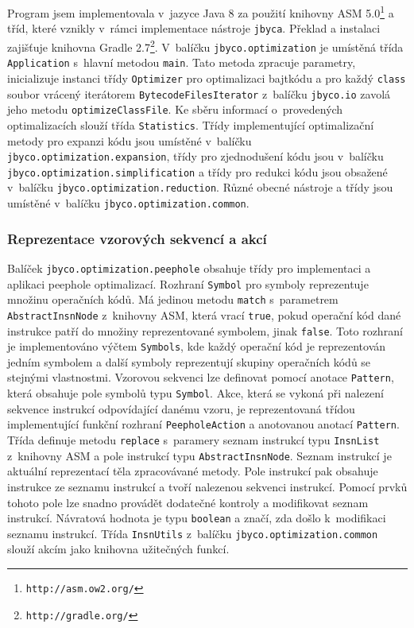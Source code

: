 Program jsem implementovala v~jazyce Java 8 za použití knihovny ASM 5.0\footnote{\texttt{http://asm.ow2.org/}} a tříd, které vznikly v~rámci implementace nástroje \texttt{jbyca}. Překlad a instalaci zajišťuje knihovna Gradle 2.7\footnote{\texttt{http://gradle.org/}}. V~balíčku \texttt{jbyco.optimization} je umístěná třída \texttt{Application} s~hlavní metodou \texttt{main}. Tato metoda zpracuje parametry, inicializuje instanci třídy \texttt{Optimizer} pro optimalizaci bajtkódu a pro každý \texttt{class} soubor vrácený iterátorem \texttt{BytecodeFilesIterator} z~balíčku \texttt{jbyco.io} zavolá jeho metodu \texttt{optimizeClassFile}. Ke sběru informací o~provedených optimalizacích slouží třída \texttt{Statistics}. Třídy implementující optimalizační metody pro expanzi kódu jsou umístěné v~balíčku \texttt{jbyco.optimization.expansion}, třídy pro zjednodušení kódu jsou v~balíčku \texttt{jbyco.optimization.simplification} a třídy pro redukci kódu jsou obsažené v~balíčku \texttt{jbyco.optimization.reduction}. Různé obecné nástroje a třídy jsou umístěné v~balíčku \texttt{jbyco.optimization.common}.

\subsubsection{Reprezentace vzorových sekvencí a akcí}

Balíček \texttt{jbyco.optimization.peephole} obsahuje třídy pro implementaci a aplikaci peephole optimalizací. Rozhraní \texttt{Symbol} pro symboly reprezentuje množinu operačních kódů. Má jedinou metodu \texttt{match} s~parametrem \texttt{AbstractInsnNode} z~knihovny ASM, která vrací \texttt{true}, pokud operační kód dané instrukce patří do množiny reprezentované symbolem, jinak \texttt{false}. Toto rozhraní je implementováno výčtem \texttt{Symbols}, kde každý operační kód je reprezentován jedním symbolem a další symboly reprezentují skupiny operačních kódů se stejnými vlastnostmi. Vzorovou sekvenci lze definovat pomocí anotace \texttt{Pattern}, která obsahuje pole symbolů typu \texttt{Symbol}. Akce, která se vykoná při nalezení sekvence instrukcí odpovídající danému vzoru, je reprezentovaná třídou implementující funkční rozhraní \texttt{PeepholeAction} a anotovanou anotací \texttt{Pattern}. Třída definuje metodu \texttt{replace} s~paramery seznam instrukcí typu \texttt{InsnList} z~knihovny ASM a pole instrukcí typu \texttt{AbstractInsnNode}. Seznam instrukcí je aktuální reprezentací těla zpracovávané metody. Pole instrukcí pak obsahuje instrukce ze seznamu instrukcí a tvoří nalezenou sekvenci instrukcí. Pomocí prvků tohoto pole lze snadno provádět dodatečné kontroly a modifikovat seznam instrukcí. Návratová hodnota je typu \texttt{boolean} a značí, zda došlo k~modifikaci seznamu instrukcí. Třída \texttt{InsnUtils} z~balíčku \texttt{jbyco.optimization.common} slouží akcím jako knihovna užitečných funkcí.

